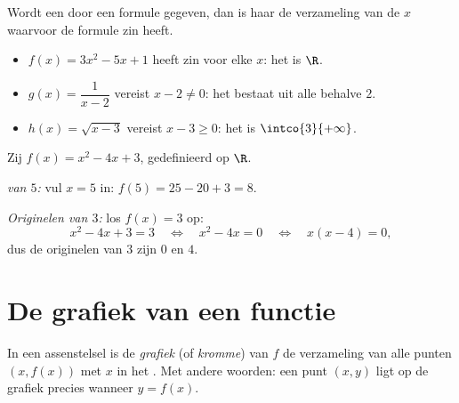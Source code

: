 \begin{example}\label{ex:g10:functions:domain}
Wordt een  door een formule gegeven, dan is haar  de
verzameling van de $x$ waarvoor de formule zin heeft.
\begin{itemize}
  \item $f(x) = 3x^2 - 5x + 1$ heeft zin voor elke $x$: het  is $\R$.
  \item $g(x) = \dfrac{1}{x - 2}$ vereist $x - 2 \neq 0$: het  bestaat
        uit alle  behalve $2$.
  \item $h(x) = \sqrt{x - 3}$ vereist $x - 3 \geq 0$: het  is
        $\intco{3}{+\infty}$.
\end{itemize}
\end{example}

\begin{example}\label{ex:g10:functions:images}
Zij $f(x) = x^2 - 4x + 3$, gedefinieerd op $\R$.

\emph{ van $5$:} vul $x = 5$ in: $f(5) = 25 - 20 + 3 = 8$.

\emph{Originelen van $3$:} los $f(x) = 3$ op:
\[
x^2 - 4x + 3 = 3
\quad\Longleftrightarrow\quad
x^2 - 4x = 0
\quad\Longleftrightarrow\quad
x(x - 4) = 0,
\]
dus de originelen van $3$ zijn $0$ en $4$.
\end{example}

\section{De grafiek van een functie}

\begin{definition}[Grafiek]\label{def:g10:functions:graph}
In een assenstelsel is de \emph{grafiek} (of \emph{kromme})
van $f$ de verzameling van alle punten $(x, f(x))$ met $x$ in het .
Met andere woorden: een punt $(x, y)$ ligt op de grafiek precies wanneer
$y = f(x)$.
\end{definition}

